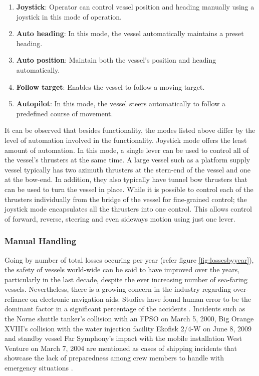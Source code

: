 \begin{enumerate}

\item \textbf{Joystick}: Operator can control vessel position and heading manually using a joystick in this mode of operation. 
\item \textbf{Auto heading}: In this mode, the vessel automatically maintains a preset heading. 
\item \textbf{Auto position}: Maintain both the vessel's position and heading automatically. 
\item \textbf{Follow target}: Enables the vessel to follow a moving target. 
\item \textbf{Autopilot}: In this mode, the vessel steers automatically to follow a predefined course of movement. 

\end{enumerate}

It can be observed that besides functionality, the modes listed above differ by the level of automation involved in the functionality. Joystick mode offers the least amount of automation. In this mode, a single lever can be used to control all of the vessel's thrusters at the same time. A large vessel such as a platform supply vessel typically has two azimuth thrusters at the stern-end of the vessel and one at the bow-end. In addition, they also typically have tunnel bow thrusters that can be used to turn the vessel in place. While it is possible to control each of the thrusters individually from the bridge of the vessel for fine-grained control; the joystick mode encapsulates all the thrusters into one control. This allows control of forward, reverse, steering and even sideways motion using just one lever. 


\subsubsection{Manual Handling}
Going by number of total losses occuring per year (refer figure \ref{fig:lossesbyyear}), the safety of vessels world-wide can be said to have improved over the years, particularly in the last decade, despite the ever increasing number of sea-faring vessels. Nevertheless, there is a growing concern in the industry regarding over-reliance on electronic navigation aids. Studies have found human error to be the dominant factor in a significant percentage of the accidents \parencite{baker2005accident, hauff2014analysis}. Incidents such as the Norne shuttle tanker's collision with an FPSO on March 5, 2000, Big Orange XVIII's collision with the water injection facility Ekofisk 2/4-W on June 8, 2009 and standby vessel Far Symphony's impact with the mobile installation West Venture on March 7, 2004 are mentioned as cases of shipping incidents that showcase the lack of preparedness among crew members to handle with emergency situations \parencite{vinnem2013offshore}.

